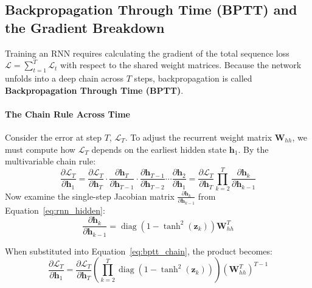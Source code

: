 \subsection{Backpropagation Through Time (BPTT) and the Gradient Breakdown}\label{subsec:bptt_vanishing}

Training an RNN requires calculating the gradient of the total sequence loss $\mathcal{L} = \sum_{t=1}^T \mathcal{L}_t$ with respect to the shared weight matrices. Because the network unfolds into a deep chain across $T$ steps, backpropagation is called \textbf{Backpropagation Through Time (BPTT)}.

\paragraph{The Chain Rule Across Time}
Consider the error at step $T$, $\mathcal{L}_T$. To adjust the recurrent weight matrix $\mathbf{W}_{hh}$, we must compute how $\mathcal{L}_T$ depends on the earliest hidden state $\mathbf{h}_1$. By the multivariable chain rule:
\begin{equation}
\frac{\partial \mathcal{L}_T}{\partial \mathbf{h}_1} = \frac{\partial \mathcal{L}_T}{\partial \mathbf{h}_T} \cdot \frac{\partial \mathbf{h}_T}{\partial \mathbf{h}_{T-1}} \cdot \frac{\partial \mathbf{h}_{T-1}}{\partial \mathbf{h}_{T-2}} \cdots \frac{\partial \mathbf{h}_2}{\partial \mathbf{h}_1} = \frac{\partial \mathcal{L}_T}{\partial \mathbf{h}_T} \prod_{k=2}^T \frac{\partial \mathbf{h}_k}{\partial \mathbf{h}_{k-1}}\label{eq:bptt_chain}
\end{equation}
Now examine the single-step Jacobian matrix $\frac{\partial \mathbf{h}_k}{\partial \mathbf{h}_{k-1}}$ from Equation~\eqref{eq:rnn_hidden}:
\begin{equation}
\frac{\partial \mathbf{h}_k}{\partial \mathbf{h}_{k-1}} = \operatorname{diag}\left(1 - \tanh^2(\mathbf{z}_k)\right) \mathbf{W}_{hh}^T\label{eq:jacobian_step}
\end{equation}

When substituted into Equation~\eqref{eq:bptt_chain}, the product becomes:
\begin{equation}
\frac{\partial \mathcal{L}_T}{\partial \mathbf{h}_1} = \frac{\partial \mathcal{L}_T}{\partial \mathbf{h}_T} \left( \prod_{k=2}^T \operatorname{diag}\left(1 - \tanh^2(\mathbf{z}_k)\right) \right) (\mathbf{W}_{hh}^T)^{T-1}\label{eq:matrix_power}
\end{equation}

